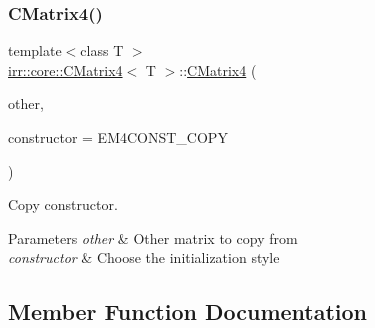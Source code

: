 \subsubsection{\texorpdfstring{C\+Matrix4()}{CMatrix4()}\hspace{0.1cm}{\footnotesize\ttfamily [2/2]}}
{\footnotesize\ttfamily template$<$class T $>$ \\
\hyperlink{classirr_1_1core_1_1CMatrix4}{irr\+::core\+::\+C\+Matrix4}$<$ T $>$\+::\hyperlink{classirr_1_1core_1_1CMatrix4}{C\+Matrix4} (\begin{DoxyParamCaption}\item[{const \hyperlink{classirr_1_1core_1_1CMatrix4}{C\+Matrix4}$<$ T $>$ \&}]{other,  }\item[{\hyperlink{classirr_1_1core_1_1CMatrix4_a7bb79712227617f706ed57a34f3eb4fe}{e\+Constructor}}]{constructor = {\ttfamily EM4CONST\+\_\+COPY} }\end{DoxyParamCaption})\hspace{0.3cm}{\ttfamily [inline]}}



Copy constructor. 


\begin{DoxyParams}{Parameters}
{\em other} & Other matrix to copy from \\
\hline
{\em constructor} & Choose the initialization style \\
\hline
\end{DoxyParams}


\subsection{Member Function Documentation}
\mbox{\label{classirr_1_1core_1_1CMatrix4_ad2dc80f2aed15900839389cf52f9e798}} 

